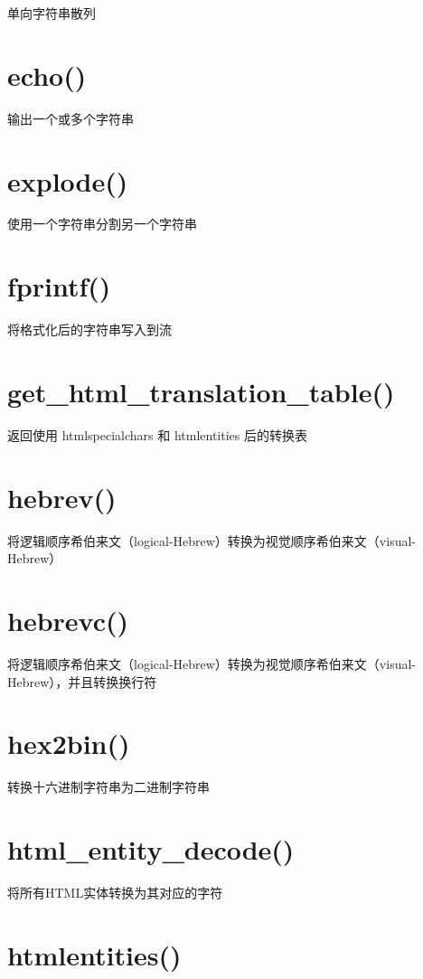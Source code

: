 单向字符串散列

\section{echo()}

输出一个或多个字符串

\section{explode()}

使用一个字符串分割另一个字符串

\section{fprintf()}

将格式化后的字符串写入到流

\section{get\_html\_translation\_table()}

返回使用 htmlspecialchars 和 htmlentities 后的转换表

\section{hebrev()}

将逻辑顺序希伯来文（logical-Hebrew）转换为视觉顺序希伯来文（visual-Hebrew）

\section{hebrevc()}

将逻辑顺序希伯来文（logical-Hebrew）转换为视觉顺序希伯来文（visual-Hebrew），并且转换换行符

\section{hex2bin()}

转换十六进制字符串为二进制字符串

\section{html\_entity\_decode()}

将所有HTML实体转换为其对应的字符

\section{htmlentities()}


